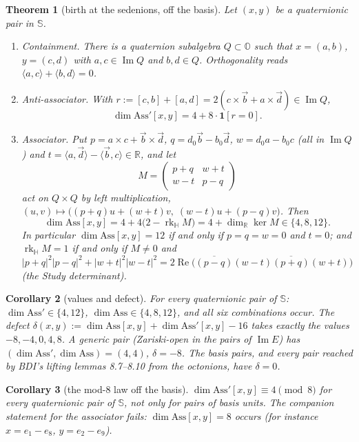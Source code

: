 \documentclass{baustms}
\DeclareMathOperator{\Reop}{Re}
\theoremstyle{cupthm}
\newtheorem{thm}{Theorem}[section]
\newtheorem{cor}[thm]{Corollary}
\numberwithin{equation}{section}
\newcommand{\Ass}{\mathrm{Ass}}
\newcommand{\HH}{\mathbb{H}}
\newcommand{\OO}{\mathbb{O}}
\newcommand{\RR}{\mathbb{R}}
\newcommand{\Sed}{\mathbb{S}}
\newcommand{\Imm}{\operatorname{Im}}
\newcommand{\rk}{\operatorname{rk}}
\newcommand{\one}[1]{\mathbf{1}[#1]}
\begin{document}
\begin{thm}[birth at the sedenions, off the basis]\label{thm:1}
Let $(x,y)$ be a quaternionic pair in $\Sed$.
\begin{enumerate}
\item[\rm(i)] \emph{Containment.} There is a quaternion subalgebra $Q\subset\OO$ such that $x=(a,b)$, $y=(c,d)$ with $a,c\in\Imm Q$ and $b,d\in Q$. Orthogonality reads $\langle a,c\rangle+\langle b,d\rangle=0$.
\item[\rm(ii)] \emph{Anti-associator.} With $r:=[c,b]+[a,d]=2(c\times\vec{b}+a\times\vec{d})\in\Imm Q$,
\begin{equation}
\dim\Ass'[x,y]=4+8\cdot\one{r=0}.
\label{eq:N}
\end{equation}
\item[\rm(iii)] \emph{Associator.} Put $p=a\times c+\vec{b}\times\vec{d}$, $q=d_0\vec{b}-b_0\vec{d}$, $w=d_0 a-b_0 c$ (all in $\Imm Q$) and $t=\langle a,\vec{d}\rangle-\langle\vec{b},c\rangle\in\RR$, and let
\begin{equation}
M=\begin{pmatrix}p+q&w+t\\ w-t&p-q\end{pmatrix}
\label{eq:M}
\end{equation}
act on $Q\times Q$ by left multiplication, $(u,v)\mapsto\bigl((p+q)u+(w+t)v,\;(w-t)u+(p-q)v\bigr)$. Then
\begin{equation}
\dim\Ass[x,y]=4+4\bigl(2-\rk_{\HH} M\bigr)=4+\dim_{\RR}\ker M\in\{4,8,12\}.
\label{eq:A}
\end{equation}
In particular $\dim\Ass[x,y]=12$ if and only if $p=q=w=0$ and $t=0$; and $\rk_{\HH} M=1$ if and only if $M\neq 0$ and
$|p+q|^2|p-q|^2+|w+t|^2|w-t|^2=2\Reop\bigl(\overline{(p-q)}(w-t)\overline{(p+q)}(w+t)\bigr)$
(the Study determinant).
\end{enumerate}
\end{thm}

\begin{cor}[values and defect]\label{cor:1}
For every quaternionic pair of $\Sed$: $\dim\Ass'\in\{4,12\}$, $\dim\Ass\in\{4,8,12\}$, and all six combinations occur. The defect $\delta(x,y):=\dim\Ass[x,y]+\dim\Ass'[x,y]-16$ takes exactly the values $-8,-4,0,4,8$. A generic pair (Zariski-open in the pairs of $\Imm E$) has $(\dim\Ass',\dim\Ass)=(4,4)$, $\delta=-8$. The basis pairs, and every pair reached by BDI's lifting lemmas 8.7--8.10 from the octonions, have $\delta=0$.
\end{cor}

\begin{cor}[the mod-8 law off the basis]\label{cor:2}
$\dim\Ass'[x,y]\equiv 4\pmod{8}$ for every quaternionic pair of $\Sed$, not only for pairs of basis units. The companion statement for the associator fails: $\dim\Ass[x,y]=8$ occurs (for instance $x=e_1-e_8$, $y=e_2-e_9$).
\end{cor}
\end{document}
